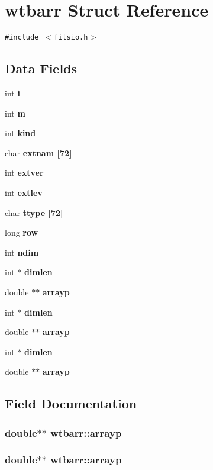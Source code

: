 \section{wtbarr Struct Reference}
\label{structwtbarr}
{\tt \#include $<$fitsio.h$>$}

\subsection*{Data Fields}
\begin{CompactItemize}
\item 
int \bf{i}
\item 
int \bf{m}
\item 
int \bf{kind}
\item 
char \bf{extnam} [72]
\item 
int \bf{extver}
\item 
int \bf{extlev}
\item 
char \bf{ttype} [72]
\item 
long \bf{row}
\item 
int \bf{ndim}
\item 
int $\ast$ \bf{dimlen}
\item 
double $\ast$$\ast$ \bf{arrayp}
\item 
int $\ast$ \bf{dimlen}
\item 
double $\ast$$\ast$ \bf{arrayp}
\item 
int $\ast$ \bf{dimlen}
\item 
double $\ast$$\ast$ \bf{arrayp}
\end{CompactItemize}


\subsection{Field Documentation}
\subsubsection{\setlength{\rightskip}{0pt plus 5cm}double$\ast$$\ast$ \bf{wtbarr::arrayp}}\label{structwtbarr_d7d5ac0a7880f57ab1a95a959a1711ec}


\subsubsection{\setlength{\rightskip}{0pt plus 5cm}double$\ast$$\ast$ \bf{wtbarr::arrayp}}\label{structwtbarr_d7d5ac0a7880f57ab1a95a959a1711ec}


